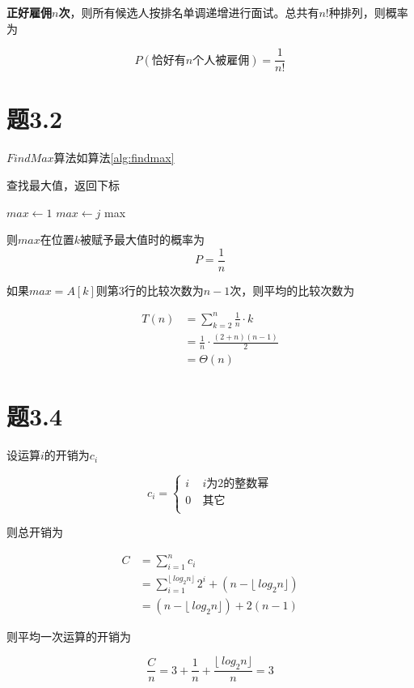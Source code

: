 \documentclass[a4paper,twoside]{article}
\begin{document}
\begin{spacing}{1.2}
\textbf{正好雇佣$n$次}，则所有候选人按排名单调递增进行面试。总共有$n!$种排列，则概率为

$$
P(\mbox{恰好有$n$个人被雇佣})=\frac{1}{n!}
$$

\section{题3.2}

$FindMax$算法如算法\ref{alg:findmax}

\begin{algorithm}
	\caption{查找最大值，返回下标}
	\label{alg:findmax}
	\begin{algorithmic}[1]
		\State $max \gets 1$
		\State $max \gets j$
		\EndIf
		\EndFor
		\Return max
		\EndProcedure
		
	\end{algorithmic}
\end{algorithm}

则$max$在位置$k$被赋予最大值时的概率为
$$
P=\frac{1}{n}
$$

如果$max=A[k]$则第$3$行的比较次数为$n-1$次，则平均的比较次数为

\begin{align*}
	T(n) &= \sum_{k=2}^{n}\frac{1}{n} \cdot k \\
	&= \frac{1}{n} \cdot \frac{(2+n)(n-1)}{2} \\
	&= \Theta(n)
\end{align*}

\section{题3.4}

设运算$i$的开销为$c_i$

$$ c_i=\left\{
\begin{aligned}
	i & \  \mbox{$i$为$2$的整数幂} \\
	0 & \  \mbox{其它} \\
\end{aligned}
\right.
$$

则总开销为

\begin{align*}
	C &= \sum_{i=1}^{n}c_i \\
	&= \sum_{i=1}^{\lfloor\ log_2 n \rfloor}2^i+(n-\lfloor\ log_2 n \rfloor) \\
	&= (n-\lfloor\ log_2 n \rfloor) + 2(n-1)
\end{align*}

则平均一次运算的开销为

$$
\frac{C}{n} = 3+\frac{1}{n}+\frac{\lfloor\ log_2 n \rfloor}{n} = 3
$$


\end{spacing}
\end{document}
